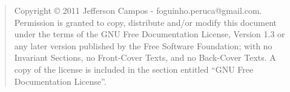 \begin{quote}
    Copyright \copyright{}  2011  Jefferson Campos - foguinho.peruca@gmail.com.
    Permission is granted to copy, distribute and/or modify this document
    under the terms of the GNU Free Documentation License, Version 1.3
    or any later version published by the Free Software Foundation;
    with no Invariant Sections, no Front-Cover Texts, and no Back-Cover Texts.
    A copy of the license is included in the section entitled ``GNU
    Free Documentation License''.
\end{quote}

\documentclass[a4paper,12pt]{article}
\usepackage[brazil]{babel}
\usepackage[latin1]{inputec}


\section Revis\~ao.

\begin{enumeration}
\item Dada a fun\c{c}\~ao, d\^e o dom\'inio:
\begin{itemize}
\item f(x) = {2x, se x <= 1} ou {-x + 1, se x > 1}
\item f(x) = {4x^2, se 0 < x <= 4} ou {-1 se x < 0} ou {x-5 se x >= 4}
\end{itemize}
\item De o dom\'inio de f(x):
\begin{itemize}
\item
\item
\end{itemize}
\item Sejam f(x)
\begin{itemize}
\item
\item
\end{itemize}
\end{enumeration}










